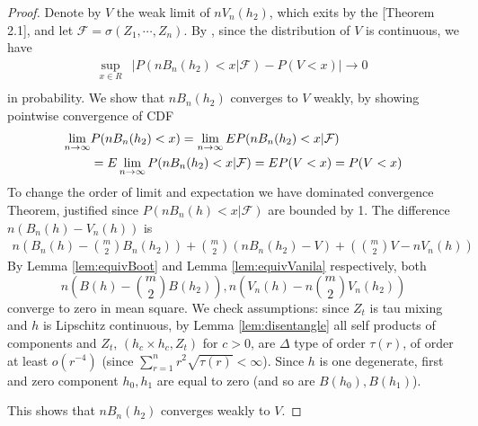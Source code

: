 \begin{proof}
Denote by $V$ the weak limit of $n V_n(h_2)$, which exits by the  \cite{leucht_dependent_2013}[Theorem 2.1],  and let $\mathcal{F} = \sigma(Z_1, \cdots , Z_n)$.   By \cite[Theorem 3.1]{leucht_dependent_2013}, since the distribution of  $V$ is continuous, we have 
\begin{align*}
\sup_{x \in R} &\left| P(nB_n(h_2)  < x|\mathcal{F}) -   P(V<x) \right| \to 0  \\
\end{align*}
in probability. We show that $nB_n(h_2)$ converges  to $V$ weakly, by showing  pointwise convergence  of CDF  
\begin{align*}
 \lim_{n \to \infty} &P(nB_n(h_2)  < x) =  \lim_{n \to \infty} E P(nB_n(h_2)  < x|\mathcal{F}) \\
 &=  E  \lim_{n \to \infty} P(nB_n(h_2)  < x|\mathcal{F})  = E P(V<x) =P(V<x) 
\end{align*}
To change the order of limit and expectation we have dominated convergence Theorem, justified since  $P(nB_n(h)  < x|\mathcal{F})$  are bounded by 1.
The difference $n(B_n(h) - V_n(h))$ is
\begin{align*}
 n \left (B_n(h) -  \binom m 2 B_n(h_2) \right) + \binom m 2 \left (n B_n(h_2) -V\right)+ \left (\binom m 2 V - nV_n(h)\right)
 \end{align*}
By  Lemma \ref{lem:equivBoot} and Lemma \ref{lem:equivVanila} respectively, both 
$$n (B(h) -   \binom m 2  B(h_2)) , n (V_n(h) - n \binom m 2 V_n(h_2))$$
converge to zero in mean square. We check assumptions: since $Z_t$ is tau mixing and $h$ is Lipschitz continuous, by Lemma \ref{lem:disentangle} all self products of components and $Z_t$, $(h_c \times h_c,Z_t)$ for $c>0$, are $\varDelta$ type of order $\tau(r)$, of order at least  $o(r^{-4})$ (since $\sum_{r=1}^n r^2 \sqrt{\tau(r)} < \infty$). Since $h$ is one degenerate,  first and zero component $h_0,h_1$ are equal to zero (and so are $B(h_0),B(h_1)$).  

This shows that $nB_n(h_2)$ converges weakly to $V$. 
\end{proof}  

